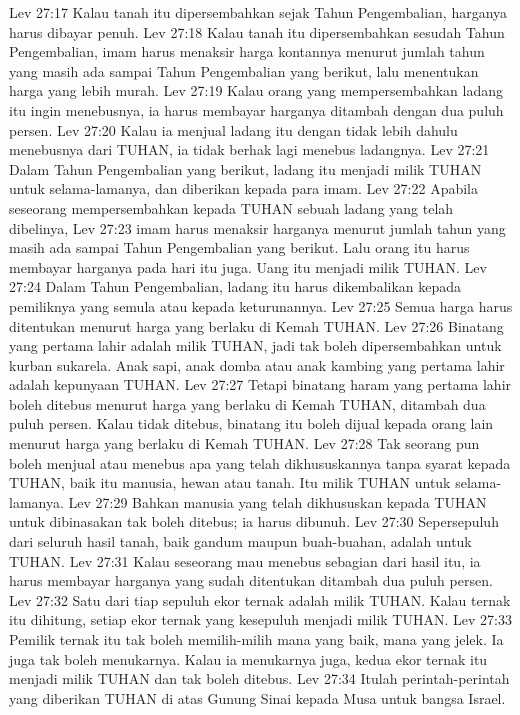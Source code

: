 Lev 27:17  Kalau tanah itu dipersembahkan sejak Tahun Pengembalian, harganya harus dibayar penuh.
Lev 27:18  Kalau tanah itu dipersembahkan sesudah Tahun Pengembalian, imam harus menaksir harga kontannya menurut jumlah tahun yang masih ada sampai Tahun Pengembalian yang berikut, lalu menentukan harga yang lebih murah.
Lev 27:19  Kalau orang yang mempersembahkan ladang itu ingin menebusnya, ia harus membayar harganya ditambah dengan dua puluh persen.
Lev 27:20  Kalau ia menjual ladang itu dengan tidak lebih dahulu menebusnya dari TUHAN, ia tidak berhak lagi menebus ladangnya.
Lev 27:21  Dalam Tahun Pengembalian yang berikut, ladang itu menjadi milik TUHAN untuk selama-lamanya, dan diberikan kepada para imam.
Lev 27:22  Apabila seseorang mempersembahkan kepada TUHAN sebuah ladang yang telah dibelinya,
Lev 27:23  imam harus menaksir harganya menurut jumlah tahun yang masih ada sampai Tahun Pengembalian yang berikut. Lalu orang itu harus membayar harganya pada hari itu juga. Uang itu menjadi milik TUHAN.
Lev 27:24  Dalam Tahun Pengembalian, ladang itu harus dikembalikan kepada pemiliknya yang semula atau kepada keturunannya.
Lev 27:25  Semua harga harus ditentukan menurut harga yang berlaku di Kemah TUHAN.
Lev 27:26  Binatang yang pertama lahir adalah milik TUHAN, jadi tak boleh dipersembahkan untuk kurban sukarela. Anak sapi, anak domba atau anak kambing yang pertama lahir adalah kepunyaan TUHAN.
Lev 27:27  Tetapi binatang haram yang pertama lahir boleh ditebus menurut harga yang berlaku di Kemah TUHAN, ditambah dua puluh persen. Kalau tidak ditebus, binatang itu boleh dijual kepada orang lain menurut harga yang berlaku di Kemah TUHAN.
Lev 27:28  Tak seorang pun boleh menjual atau menebus apa yang telah dikhususkannya tanpa syarat kepada TUHAN, baik itu manusia, hewan atau tanah. Itu milik TUHAN untuk selama-lamanya.
Lev 27:29  Bahkan manusia yang telah dikhususkan kepada TUHAN untuk dibinasakan tak boleh ditebus; ia harus dibunuh.
Lev 27:30  Sepersepuluh dari seluruh hasil tanah, baik gandum maupun buah-buahan, adalah untuk TUHAN.
Lev 27:31  Kalau seseorang mau menebus sebagian dari hasil itu, ia harus membayar harganya yang sudah ditentukan ditambah dua puluh persen.
Lev 27:32  Satu dari tiap sepuluh ekor ternak adalah milik TUHAN. Kalau ternak itu dihitung, setiap ekor ternak yang kesepuluh menjadi milik TUHAN.
Lev 27:33  Pemilik ternak itu tak boleh memilih-milih mana yang baik, mana yang jelek. Ia juga tak boleh menukarnya. Kalau ia menukarnya juga, kedua ekor ternak itu menjadi milik TUHAN dan tak boleh ditebus.
Lev 27:34  Itulah perintah-perintah yang diberikan TUHAN di atas Gunung Sinai kepada Musa untuk bangsa Israel.



